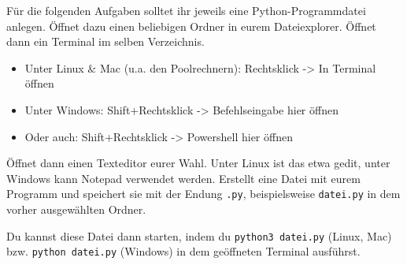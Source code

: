 Für die folgenden Aufgaben solltet ihr jeweils eine Python-Programmdatei
anlegen. Öffnet dazu einen beliebigen Ordner in eurem Dateiexplorer. Öffnet
dann ein Terminal im selben Verzeichnis.

\begin{itemize}
\item Unter Linux \& Mac (u.a. den Poolrechnern): Rechtsklick -> In Terminal öffnen
\item Unter Windows: Shift+Rechtsklick -> Befehlseingabe hier öffnen
\item Oder auch: Shift+Rechtsklick -> Powershell hier öffnen
\end{itemize}

Öffnet dann einen Texteditor eurer Wahl. Unter Linux ist das etwa gedit, unter
Windows kann Notepad verwendet werden. Erstellt eine Datei mit eurem Programm
und speichert sie mit der Endung \texttt{.py}, beispielsweise \texttt{datei.py}
in dem vorher ausgewählten Ordner.

Du kannst diese Datei dann starten, indem du \texttt{python3 datei.py} (Linux, Mac)
bzw. \texttt{python datei.py} (Windows) in dem geöffneten Terminal ausführst.
